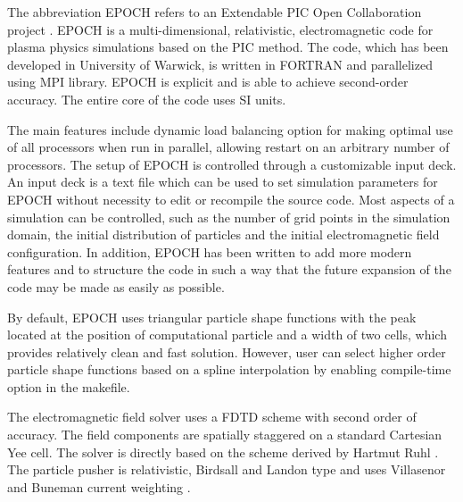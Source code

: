 The abbreviation EPOCH refers to an Extendable PIC Open Collaboration project \cite{bennett}. EPOCH is a multi-dimensional, relativistic, electromagnetic code for plasma physics simulations based on the PIC method. The code, which has been developed in University of Warwick, is written in FORTRAN and parallelized using MPI library. EPOCH is explicit and is able to achieve second-order accuracy. The entire core of the code uses SI units.

The main features include dynamic load balancing option for making optimal use of all processors when run in parallel, allowing restart on an arbitrary number of processors. The setup of EPOCH is controlled through a customizable input deck. An input deck is a text file which can be used to set simulation parameters for EPOCH without necessity to edit or recompile the source code. Most aspects of a simulation can be controlled, such as the number of grid points in the simulation domain, the initial distribution of particles and the initial electromagnetic field configuration. In addition, EPOCH has been written to add more modern features and to structure the code in such a way that the future expansion of the code may be made as easily as possible.

By default, EPOCH uses triangular particle shape functions with the peak located at the position of computational particle and a width of two cells, which provides relatively clean and fast solution. However, user can select higher order particle shape functions based on a spline interpolation by enabling compile-time option in the makefile.

The electromagnetic field solver uses a FDTD scheme with second order of accuracy. The field components are spatially staggered on a standard Cartesian Yee cell. The solver is directly based on the scheme derived by Hartmut Ruhl \cite{ruhl}. The particle pusher is relativistic, Birdsall and Landon type \cite{birdsall} and uses Villasenor and Buneman current weighting \cite{villasenor}.  

